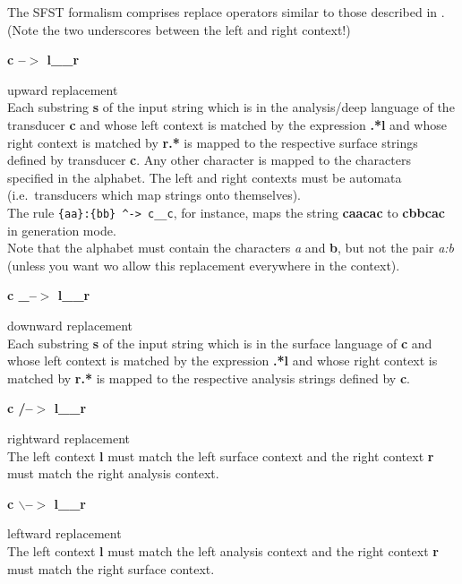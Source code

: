 \documentclass{article}
\begin{document}
The SFST formalism comprises replace operators similar to those
described in \cite{Karttunen95}. (Note the two underscores between the
left and right context!)

\parbox[t]{2.5cm}{\textbf{c --$>$ l\_\_r}}
\begin{minipage}[t]{11.5cm}
  upward replacement\\
  Each substring \textbf{s} of the input string which is in the
  analysis/deep language of the transducer \textbf{c} and whose left
  context is matched by the expression \textbf{.*l} and whose right
  context is matched by \textbf{r.*} is mapped to the respective
  surface strings defined by transducer \textbf{c}. Any other
  character is mapped to the characters specified in the alphabet. The
  left and right contexts must be automata (i.e.\ transducers which
  map strings onto themselves).\\
  The rule \verb#{aa}:{bb} ^-> c__c#, for instance, maps
  the string \textbf{caacac} to \textbf{cbbcac} in generation mode.\\
  Note that the alphabet must contain the characters \emph{a} and
  \textbf{b}, but not the pair \emph{a:b} (unless you want wo allow
  this replacement everywhere in the context).
\end{minipage}

\parbox[t]{2.5cm}{\textbf{c \_--$>$ l\_\_r}}
\begin{minipage}[t]{11.5cm}
  downward replacement\\
  Each substring \textbf{s} of the input string which is in the
  surface language of \textbf{c} and whose left context is matched by
  the expression \textbf{.*l} and whose right context is matched by
  \textbf{r.*} is mapped to the respective analysis strings defined by
  \textbf{c}. 
\end{minipage}

\parbox[t]{2.5cm}{\textbf{c /--$>$ l\_\_r}}
\begin{minipage}[t]{11.5cm}
  rightward replacement\\
  The left context \textbf{l} must match the left surface context and
  the right context \textbf{r} must match the right analysis context.
\end{minipage}

\parbox[t]{2.5cm}{\textbf{c $\backslash$--$>$ l\_\_r}}
\begin{minipage}[t]{11.5cm}
  leftward replacement\\
  The left context \textbf{l} must match the left analysis context and
  the right context \textbf{r} must match the right surface context.
\end{minipage}\\
\end{document}
